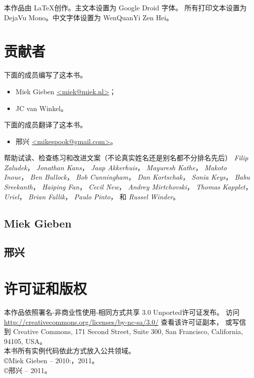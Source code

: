 \noindent{}本作品由 \LaTeX 创作。主文本设置为 Google Droid 字体。
所有打印文本设置为 DejaVu Mono。中文字体设置为 WenQuanYi Zen Hei。

\section{贡献者}
下面的成员编写了这本书。
\begin{itemize}
\item{Miek Gieben \qquad\url{<miek@miek.nl>}}；
\item{JC van Winkel}。
\end{itemize}
下面的成员翻译了这本书。
\begin{itemize}
    \item{邢兴 \qquad\url{<mikespook@gmail.com>}}。
\end{itemize}

帮助试读、检查练习和改进文案（不论真实姓名还是别名都不分排名先后）
\emph{Filip Zaludek}，
\emph{Jonathan Kans}，
\emph{Jaap Akkerhuis}，
\emph{Mayuresh Kathe}，
\emph{Makoto Inoue}，
\emph{Ben Bullock}，
\emph{Bob Cunningham}，
\emph{Dan Kortschak}，
\emph{Sonia Keys}，
\emph{Babu Sreekanth}，
\emph{Haiping Fan}，
\emph{Cecil New}，
\emph{Andrey Mirtchovski}，
\emph{Thomas Kapplet}，
\emph{Uriel}，
\emph{Brian Fallik}，
\emph{Paulo Pinto}，
和 \emph{Russel Winder}。

\subsection{Miek Gieben}


\subsection{邢兴}


\section{许可证和版权}

本作品依照署名-非商业性使用-相同方式共享 3.0 Unported许可证发布。
访问 \url{http://creativecommons.org/licenses/by-nc-sa/3.0/} 查看该许可证副本，
或写信到 Creative Commons, 171 Second Street, Suite 300,
San Francisco, California, 94105, USA。\\
本书所有实例代码依此方式放入公共领域。\\
\copyright Miek Gieben -- 2010:，2011。\\
\copyright 邢兴 -- 2011。
